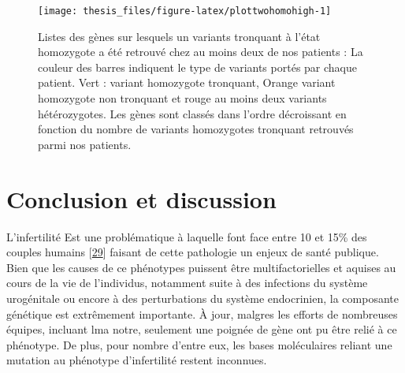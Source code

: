 \documentclass[12pt,twoside]{reedthesis}
\theoremstyle{definition}
\theoremstyle{definition}
\theoremstyle{remark}
\begin{document}
  \begin{figure}
  
  {\centering \texttt{[image: thesis\_files/figure-latex/plottwohomohigh-1]} 
  
  }
  
  \caption[Listes des gènes sur lesquels un variants tronquant à l'état homozygote a été retrouvé chez au moins deux de nos patients]{Listes des gènes sur lesquels un variants tronquant à l'état homozygote a été retrouvé chez au moins deux de nos patients : La couleur des barres indiquent le type de variants portés par chaque patient. Vert : variant homozygote tronquant, Orange variant homozygote non tronquant et rouge au moins deux variants hétérozygotes. Les gènes sont classés dans l'ordre décroissant en fonction du nombre de variants homozygotes tronquant retrouvés parmi nos patients.}\label{fig:plottwohomohigh}
  \end{figure}
  
  \chapter*{Conclusion et discussion}\label{conclusion-et-discussion}
  
  L'infertilité Est une problématique à laquelle font face entre 10 et
  15\% des couples humains {[}\protect\hyperlink{ref-Boivin2007a}{29}{]}
  faisant de cette pathologie un enjeux de santé publique. Bien que les
  causes de ce phénotypes puissent être multifactorielles et aquises au
  cours de la vie de l'individus, notamment suite à des infections du
  système urogénitale ou encore à des perturbations du système
  endocrinien, la composante génétique est extrêmement importante. À jour,
  malgres les efforts de nombreuses équipes, incluant lma notre, seulement
  une poignée de gène ont pu être relié à ce phénotype. De plus, pour
  nombre d'entre eux, les bases moléculaires reliant une mutation au
  phénotype d'infertilité restent inconnues.
  
\end{document}
